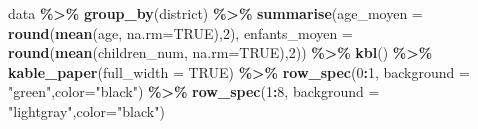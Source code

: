 \documentclass[
]{article}
\newenvironment{Shaded}{\begin{snugshade}}{\end{snugshade}}
\newcommand{\AttributeTok}[1]{\textcolor[rgb]{0.13,0.29,0.53}{#1}}
\newcommand{\ConstantTok}[1]{\textcolor[rgb]{0.56,0.35,0.01}{#1}}
\newcommand{\DecValTok}[1]{\textcolor[rgb]{0.00,0.00,0.81}{#1}}
\newcommand{\FunctionTok}[1]{\textcolor[rgb]{0.13,0.29,0.53}{\textbf{#1}}}
\newcommand{\NormalTok}[1]{#1}
\newcommand{\SpecialCharTok}[1]{\textcolor[rgb]{0.81,0.36,0.00}{\textbf{#1}}}
\newcommand{\StringTok}[1]{\textcolor[rgb]{0.31,0.60,0.02}{#1}}
\begin{document}
\begin{Shaded}
\begin{Highlighting}[]
\NormalTok{data }\SpecialCharTok{\%\textgreater{}\%}
  \FunctionTok{group\_by}\NormalTok{(district) }\SpecialCharTok{\%\textgreater{}\%}
     \FunctionTok{summarise}\NormalTok{(}\AttributeTok{age\_moyen =} \FunctionTok{round}\NormalTok{(}\FunctionTok{mean}\NormalTok{(age, }\AttributeTok{na.rm=}\ConstantTok{TRUE}\NormalTok{),}\DecValTok{2}\NormalTok{), }
               \AttributeTok{enfants\_moyen =} \FunctionTok{round}\NormalTok{(}\FunctionTok{mean}\NormalTok{(children\_num, }\AttributeTok{na.rm=}\ConstantTok{TRUE}\NormalTok{),}\DecValTok{2}\NormalTok{))  }\SpecialCharTok{\%\textgreater{}\%} 
        \FunctionTok{kbl}\NormalTok{() }\SpecialCharTok{\%\textgreater{}\%}
          \FunctionTok{kable\_paper}\NormalTok{(}\AttributeTok{full\_width =} \ConstantTok{TRUE}\NormalTok{) }\SpecialCharTok{\%\textgreater{}\%}
          \FunctionTok{row\_spec}\NormalTok{(}\DecValTok{0}\SpecialCharTok{:}\DecValTok{1}\NormalTok{, }\AttributeTok{background =} \StringTok{"green"}\NormalTok{,}\AttributeTok{color=}\StringTok{"black"}\NormalTok{) }\SpecialCharTok{\%\textgreater{}\%} 
          \FunctionTok{row\_spec}\NormalTok{(}\DecValTok{1}\SpecialCharTok{:}\DecValTok{8}\NormalTok{, }\AttributeTok{background =} \StringTok{"lightgray"}\NormalTok{,}\AttributeTok{color=}\StringTok{"black"}\NormalTok{)}
\end{Highlighting}
\end{Shaded}
\end{document}
